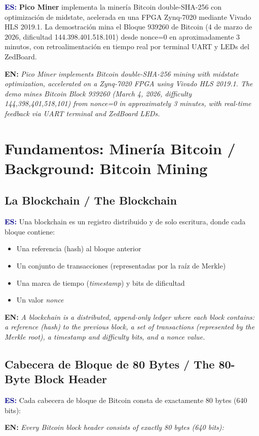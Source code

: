 \documentclass[12pt,a4paper]{article}
\newcommand{\bsection}[2]{%
    \section{#1 \textnormal{\normalsize\color{accentblue}/ #2}}%
}
\newcommand{\bsubsection}[2]{%
    \subsection{#1 \textnormal{\small\color{accentblue}/ #2}}%
}
\newenvironment{bilingual}{%
    \par\medskip
}{%
    \par\medskip
}
\newcommand{\espara}[1]{\noindent\textcolor{darkblue}{\textbf{ES:}} #1\par\smallskip}
\newcommand{\enpara}[1]{\noindent\textcolor{accentblue}{\textbf{EN:}} \textit{#1}\par\smallskip}
\begin{document}
\begin{bilingual}
\espara{%
\textbf{Pico Miner} implementa la miner\'ia Bitcoin double-SHA-256 con optimizaci\'on
de midstate, acelerada en una FPGA Zynq-7020 mediante Vivado HLS 2019.1.
La demostraci\'on mina el Bloque 939260 de Bitcoin (4 de marzo de 2026,
dificultad 144.398.401.518.101) desde nonce=0 en aproximadamente 3 minutos,
con retroalimentaci\'on en tiempo real por terminal UART y LEDs del ZedBoard.}

\enpara{%
Pico Miner implements Bitcoin double-SHA-256 mining with midstate
optimization, accelerated on a Zynq-7020 FPGA using Vivado HLS 2019.1.
The demo mines Bitcoin Block 939260 (March 4, 2026,
difficulty 144,398,401,518,101) from nonce=0 in approximately 3 minutes,
with real-time feedback via UART terminal and ZedBoard LEDs.}
\end{bilingual}

\bsection{Fundamentos: Miner\'ia Bitcoin}{Background: Bitcoin Mining}

\bsubsection{La Blockchain}{The Blockchain}

\begin{bilingual}
\espara{%
Una blockchain es un registro distribuido y de solo escritura, donde cada bloque
contiene:
\begin{itemize}[leftmargin=2em]
    \item Una referencia (hash) al bloque anterior
    \item Un conjunto de transacciones (representadas por la ra\'iz de Merkle)
    \item Una marca de tiempo (\textit{timestamp}) y bits de dificultad
    \item Un valor \textit{nonce}
\end{itemize}}

\enpara{%
A blockchain is a distributed, append-only ledger where each block contains:
a reference (hash) to the previous block, a set of transactions (represented
by the Merkle root), a timestamp and difficulty bits, and a nonce value.}
\end{bilingual}

\bsubsection{Cabecera de Bloque de 80 Bytes}{The 80-Byte Block Header}

\begin{bilingual}
\espara{%
Cada cabecera de bloque de Bitcoin consta de exactamente 80 bytes (640 bits):}

\enpara{%
Every Bitcoin block header consists of exactly 80 bytes (640 bits):}
\end{bilingual}
\end{document}
